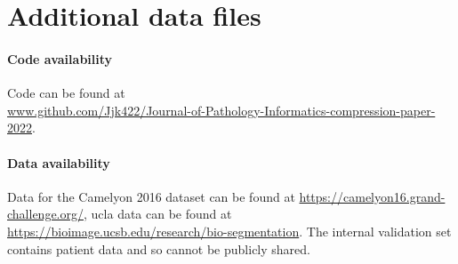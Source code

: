 \documentclass[review]{elsarticle}
\begin{document}
\section{Additional data files}
\paragraph{Code availability} Code can be found at  \\
\url{www.github.com/Jjk422/Journal-of-Pathology-Informatics-compression-paper-2022}.
\paragraph{Data availability} Data for the Camelyon 2016 dataset can be found at \url{https://camelyon16.grand-challenge.org/}, \gls{ucla} data can be found at \url{https://bioimage.ucsb.edu/research/bio-segmentation}. The internal validation set contains patient data and so cannot be publicly shared.
\end{document}
